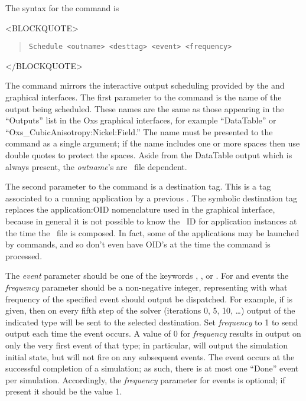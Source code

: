 \begin{description}
The syntax for the  command is
\begin{rawhtml}
<BLOCKQUOTE>
\end{rawhtml}
\begin{quote}
\begin{verbatim}
Schedule <outname> <desttag> <event> <frequency>
\end{verbatim}
\end{quote}
\begin{rawhtml}
</BLOCKQUOTE>
\end{rawhtml}
The  command mirrors the interactive output scheduling
provided by the
 and
graphical interfaces.  The first parameter
to the  command is the name of the output being scheduled.
These names are the same as those appearing in the ``Outputs'' list in
the Oxs graphical interfaces, for example ``DataTable'' or
``Oxs\_CubicAnisotropy:Nickel:Field.''  The name must be presented to
the  command as a single argument; if the name includes one
or more spaces then use double quotes to protect the spaces.  Aside from
the DataTable output which is always present, the
\textit{outname}'s are \MIF\ file dependent.

The second parameter to the  command is a destination tag.
This is a tag associated to a running application by a previous
.  The symbolic destination tag replaces the application:OID
nomenclature used in the graphical interface, because in general it is
not possible to know the \OOMMF\ ID for application instances at the
time the \MIF\ file is composed.  In fact, some of the applications may
be launched by  commands, and so don't even have OID's
at the time the  command is processed.

The \textit{event} parameter should be one of the keywords ,
, or .  For  and  events the
\textit{frequency} parameter should be a non-negative integer, representing
with what frequency of the specified event should output be dispatched.
For example, if  is given, then on every fifth step of the
solver (iterations 0, 5, 10, \ldots) output of the indicated type will
be sent to the selected destination.  Set \textit{frequency} to 1 to
send output each time the event occurs. A value of 0
for \textit{frequency} results in output on only the very first event of
that type; in particular,  will output the simulation initial
state, but will not fire on any subsequent  events.
The  event occurs at the successful completion of a simulation;
as such, there is at most one ``Done'' event per simulation.
Accordingly, the \textit{frequency} parameter for  events is
optional; if present it should be the value 1.


\end{description}
